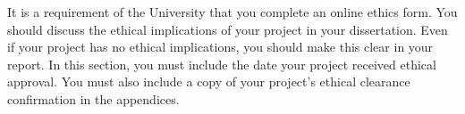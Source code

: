 
It is a requirement of the University that you complete an online ethics form. You should discuss the ethical implications of your project in your dissertation. Even if your project has no ethical implications, you should make this clear in your report. In this section, you must include the date your project received ethical approval. You must also include a copy of your project’s ethical clearance confirmation in the appendices.

